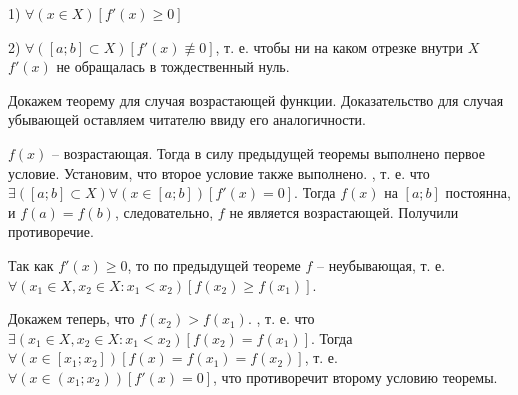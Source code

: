 1) $\forall(x \in X) [f'(x)\geq 0]$

2) $\forall([a;b] \subset X)[f'(x)\not\equiv 0]$, т. е. чтобы ни на каком отрезке внутри $X$ $f'(x)$ не обращалась в тождественный нуль.

\dokvo 

Докажем теорему для случая возрастающей функции. Доказательство для случая убывающей оставляем читателю ввиду его аналогичности.

\neobh

$f(x)$ -- возрастающая. Тогда в силу предыдущей теоремы выполнено первое условие.
Установим, что второе условие также выполнено.
\pp, т. е. что $\exists([a;b] \subset X)\forall(x \in [a;b])[f'(x)=0]$.
Тогда $f(x)$ на $[a;b]$ постоянна, и $f(a)=f(b)$, следовательно, $f$ не является возрастающей. Получили противоречие.

\dost

Так как $f'(x) \geq 0$, то по предыдущей теореме $f$ -- неубывающая, т. е.
$\forall(x_1\in X, x_2 \in X : x_1<x_2)[f(x_2) \geq f(x_1)]$.

Докажем теперь, что $f(x_2) > f(x_1)$.
\pp, т. е. что $\exists(x_1\in X, x_2 \in X : x_1<x_2)[f(x_2) = f(x_1)]$.
Тогда $\forall(x\in [x_1; x_2])[f(x)=f(x_1)=f(x_2)]$, т. е. $\forall(x\in(x_1;x_2))[f'(x)=0]$, что противоречит второму условию теоремы.

\dokno


